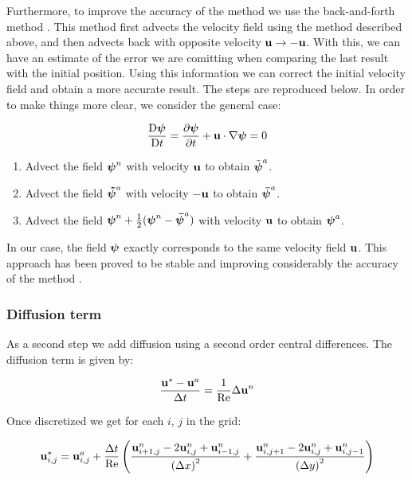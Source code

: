 Furthermore, to improve the accuracy of the method we use the back-and-forth method \cite{backforth}. This method first advects the velocity field using the method described above, and then advects back with opposite velocity $\boldsymbol{\mathrm{u}}\to -\boldsymbol{\mathrm{u}}$. With this, we can have an estimate of the error we are comitting when comparing the last result with the initial position. Using this information we can correct the initial velocity field and obtain a more accurate result. The steps are reproduced below. In order to make things more clear, we consider the general case:

\begin{equation*}
  \frac{\mathrm{D}\boldsymbol{\mathrm{\psi}}}{\mathrm{D}t} = \pdv{\boldsymbol{\mathrm{\psi}}}{t} + \boldsymbol{\mathrm{u}} \cdot \nabla \boldsymbol{\mathrm{\psi}} = 0
\end{equation*}

\begin{enumerate}
  \item Advect the field $\boldsymbol{\mathrm{\psi}}^n$ with velocity $\boldsymbol{\mathrm{u}}$ to obtain $\tilde{\boldsymbol{\mathrm{\psi}}}^a$.
  \item Advect the field $\boldsymbol{\mathrm{\tilde{\psi}}}^a$ with velocity $-\boldsymbol{\mathrm{u}}$ to obtain $\boldsymbol{\mathrm{\bar{\psi}}}^a$.
  \item Advect the field $\boldsymbol{\mathrm{\psi}}^n + \frac{1}{2} (\boldsymbol{\mathrm{{\psi}}}^n - \boldsymbol{\mathrm{\bar{\psi}}}^a)$ with velocity $\boldsymbol{\mathrm{u}}$ to obtain $\boldsymbol{\mathrm{\psi}}^a$.
\end{enumerate}

In our case, the field $\boldsymbol{\mathrm{\psi}}$ exactly corresponds to the same velocity field $\boldsymbol{\mathrm{u}}$. This approach has been proved to be stable and improving considerably the accuracy of the method \cite{backforth}. 


\subsubsection*{Diffusion term}
As a second step we add diffusion using a second order central differences. The diffusion term is given by:

\begin{equation*}
  \frac{\boldsymbol{\mathrm{u}}^* - \boldsymbol{\mathrm{u}}^a}{\Delta t} = \frac{1}{\mathrm{Re}} \Delta \boldsymbol{\mathrm{u}}^n
\end{equation*}

Once discretized we get for each $i$, $j$ in the grid:

\begin{equation*}
  \boldsymbol{\mathrm{u}}^*_{i,j} = \boldsymbol{\mathrm{u}}^a_{i,j} + \frac{\Delta t}{\mathrm{Re}}\left( \frac{\boldsymbol{\mathrm{u}}^n_{i+1,j} - 2\boldsymbol{\mathrm{u}}^n_{i,j} + \boldsymbol{\mathrm{u}}^n_{i-1,j}}{{(\Delta x)}^2} + \frac{\boldsymbol{\mathrm{u}}^n_{i,j+1} - 2\boldsymbol{\mathrm{u}}^n_{i,j} + \boldsymbol{\mathrm{u}}^n_{i,j-1}}{{(\Delta y)}^2}\right)
\end{equation*}

